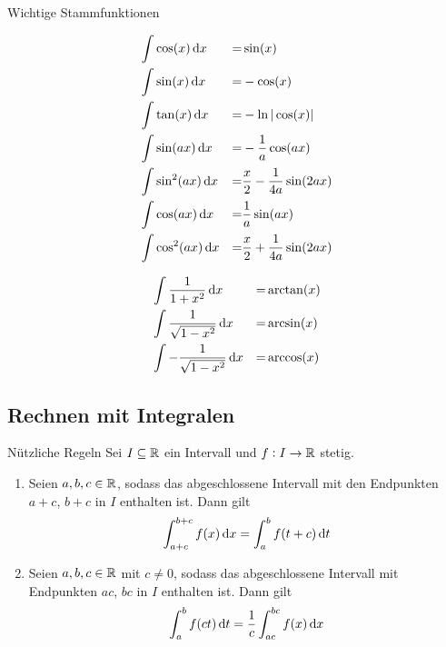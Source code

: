 \begin{highlight}{Wichtige Stammfunktionen}
    \begin{center}
        \begin{minipage}{0.4\linewidth}
            \begin{align*}
                &\int\cos (x) \dif x  &=& \sin (x) \\
                &\int\sin (x) \dif x  &=& -\cos (x) \\
                &\int\tan (x) \dif x  &=& -\ln |\cos (x)| \\
                &\int \sin(ax)\dif x  &=&  - \frac{1}{a} \cos(a x)  \\
                &\int \sin^2(ax)\dif x  &=&  \frac{x}{2} - \frac{1}{4a} \sin(2 a x)  \\
                &\int \cos(ax)\dif x  &=&  \frac{1}{a} \sin(a x)  \\
                &\int \cos^2(ax)\dif x  &=&  \frac{x}{2} + \frac{1}{4a} \sin(2 a x)  \\
            \end{align*}
        \end{minipage}
        \hfill\vline\hfill
        \begin{minipage}{0.45\linewidth}
            \begin{align*}
                &\int\frac{1}{1+x^{2}} \dif x  &=& \arctan (x)\\
                &\int\frac{1}{\sqrt{1-x^{2}}} \dif x  &=& \arcsin (x) \\
                &\int -\frac{1}{\sqrt{1-x^{2}}} \dif x  &=& \arccos (x) \\
            \end{align*}
        \end{minipage}
    \end{center}
\end{highlight}

\subsection{Rechnen mit Integralen}

\begin{corollary}{Nützliche Regeln}
    Sei $I \subseteq \mathbb{R}$ ein Intervall und $f: I \to \mathbb{R}$ stetig.
    \begin{enumerate}
        \item Seien $a,b,c \in \mathbb{R}$, sodass das abgeschlossene Intervall mit den Endpunkten $a+c$, $b+c$ in $I$ enthalten ist.
            Dann gilt
            \begin{equation}
                \int_{a+c}^{b+c} f(x) \dif x = \int_{a}^{b} f(t+c) \dif t
            \end{equation}
        \item Seien $a,b,c \in \mathbb{R}$ mit $c \neq 0$, sodass das abgeschlossene Intervall mit Endpunkten $ac$, $bc$ in $I$ enthalten ist.
            Dann gilt
            \begin{equation}
                \int_{a}^{b} f(ct) \dif t = \frac{1}{c} \int_{ac}^{bc} f(x) \dif x
            \end{equation}
    \end{enumerate}
\end{corollary}

